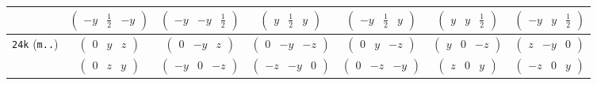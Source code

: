 \documentclass[fleqn,9pt,landscape]{jsarticle}
\begin{document}
\begin{center}
\begin{longtable}{ccccccc}
& $ \begin{pmatrix} - y & \frac{1}{2} & - y \end{pmatrix} $ & $ \begin{pmatrix} - y & - y & \frac{1}{2} \end{pmatrix} $ & $ \begin{pmatrix} y & \frac{1}{2} & y \end{pmatrix} $ & $ \begin{pmatrix} - y & \frac{1}{2} & y \end{pmatrix} $ & $ \begin{pmatrix} y & y & \frac{1}{2} \end{pmatrix} $ & $ \begin{pmatrix} - y & y & \frac{1}{2} \end{pmatrix} $ \\ \hline
{\tt 24k} ({\tt m..}) & $ \begin{pmatrix} 0 & y & z \end{pmatrix} $ & $ \begin{pmatrix} 0 & - y & z \end{pmatrix} $ & $ \begin{pmatrix} 0 & - y & - z \end{pmatrix} $ & $ \begin{pmatrix} 0 & y & - z \end{pmatrix} $ & $ \begin{pmatrix} y & 0 & - z \end{pmatrix} $ & $ \begin{pmatrix} z & - y & 0 \end{pmatrix} $ \\
& $ \begin{pmatrix} 0 & z & y \end{pmatrix} $ & $ \begin{pmatrix} - y & 0 & - z \end{pmatrix} $ & $ \begin{pmatrix} - z & - y & 0 \end{pmatrix} $ & $ \begin{pmatrix} 0 & - z & - y \end{pmatrix} $ & $ \begin{pmatrix} z & 0 & y \end{pmatrix} $ & $ \begin{pmatrix} - z & 0 & y \end{pmatrix} $ \\

\end{longtable}
\end{center}
\end{document}
